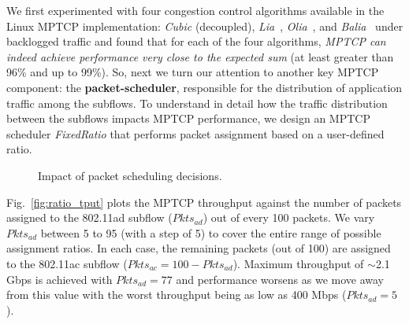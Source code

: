 We first experimented with four congestion control algorithms available in the
Linux MPTCP implementation: \emph{Cubic} (decoupled), \emph{Lia}~\cite{raiciu:rfc6356}, 
\emph{Olia}~\cite{khalili:ton2013}, and \emph{Balia}~\cite{peng:ton2016} under backlogged
traffic and found that for each of the four algorithms, \textit{MPTCP can indeed achieve 
performance very close to the expected sum} (at least greater than 96\% and up to 99\%). So,
 next we turn our attention to another key MPTCP component: the \textbf{packet-scheduler},
responsible for the distribution of application traffic among the subflows. To understand in 
detail how the traffic distribution between the subflows impacts MPTCP performance, we 
design an MPTCP scheduler \emph{FixedRatio} that performs packet assignment based on
a user-defined ratio.

\begin{figure*}[h]
    \centering
    \hfill
    \hfill
    \caption{Impact of packet scheduling decisions.}
\end{figure*}

Fig.~\ref{fig:ratio_tput} plots the MPTCP throughput against the
number of packets assigned to the 802.11ad subflow ($Pkts_{ad}$) out
of every 100 packets. We vary $Pkts_{ad}$ between 5 to 95 (with a step
of 5) to cover the entire range of possible assignment ratios. In each
case, the remaining packets (out of 100) are assigned to the 802.11ac
subflow ($Pkts_{ac}=100-Pkts_{ad}$). Maximum throughput of $\sim$2.1
Gbps is achieved with $Pkts_{ad}=77$ and performance worsens as we
move away from this value with the worst throughput being as low as
400 Mbps ($Pkts_{ad}=5$).


